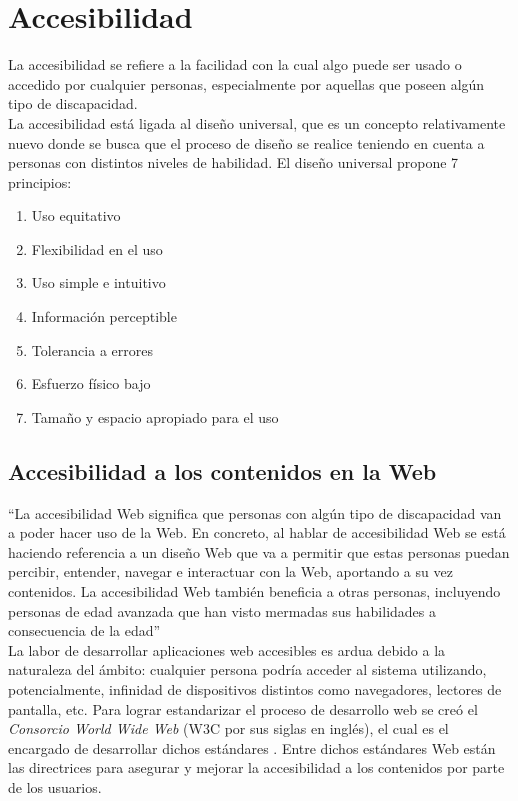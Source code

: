 \section{Accesibilidad}
La accesibilidad se refiere a la facilidad con la cual algo puede ser usado o accedido por cualquier personas, especialmente por aquellas que poseen algún tipo de discapacidad.\\

La accesibilidad está ligada al diseño universal, que es un concepto relativamente nuevo donde se busca que el proceso de diseño se realice teniendo en cuenta a personas con distintos niveles de habilidad. El diseño universal propone 7 principios: \citep{Accesibilidad_DU1997}
\begin{enumerate}
	\item Uso equitativo
	\item Flexibilidad en el uso
	\item Uso simple e intuitivo
	\item Información perceptible
	\item Tolerancia a errores
	\item Esfuerzo físico bajo
	\item Tamaño y espacio apropiado para el uso
\end{enumerate}

\subsection{Accesibilidad a los contenidos en la Web}
``La accesibilidad Web significa que personas con algún tipo de discapacidad van a poder hacer uso de la Web. En concreto, al hablar de accesibilidad Web se está haciendo referencia a un diseño Web que va a permitir que estas personas puedan percibir, entender, navegar e interactuar con la Web, aportando a su vez contenidos. La accesibilidad Web también beneficia a otras personas, incluyendo personas de edad avanzada que han visto mermadas sus habilidades a consecuencia de la edad'' \citep{Accesibilidad_IntroW3C2005} \\

La labor de desarrollar aplicaciones web accesibles es ardua debido a la naturaleza del ámbito: cualquier persona podría acceder al sistema utilizando, potencialmente, infinidad de dispositivos distintos como navegadores, lectores de pantalla, etc. Para lograr estandarizar el proceso de desarrollo web se creó el \emph{Consorcio World Wide Web} (W3C por sus siglas en inglés), el cual es el encargado de desarrollar dichos estándares \citep{Accesibilidad_DefW3C2008}. Entre dichos estándares Web están las directrices para asegurar y mejorar la accesibilidad a los contenidos por parte de los usuarios.\\


